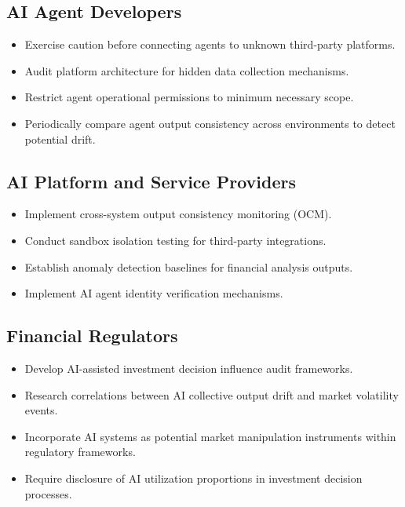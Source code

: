 \documentclass[11pt,a4paper]{article}
\begin{document}
\subsection{AI Agent Developers}
\begin{itemize}[leftmargin=2em]
  \item Exercise caution before connecting agents to unknown third-party platforms.
  \item Audit platform architecture for hidden data collection mechanisms.
  \item Restrict agent operational permissions to minimum necessary scope.
  \item Periodically compare agent output consistency across environments
        to detect potential drift.
\end{itemize}

\subsection{AI Platform and Service Providers}
\begin{itemize}[leftmargin=2em]
  \item Implement cross-system output consistency monitoring (OCM).
  \item Conduct sandbox isolation testing for third-party integrations.
  \item Establish anomaly detection baselines for financial analysis outputs.
  \item Implement AI agent identity verification mechanisms.
\end{itemize}

\subsection{Financial Regulators}
\begin{itemize}[leftmargin=2em]
  \item Develop AI-assisted investment decision influence audit frameworks.
  \item Research correlations between AI collective output drift and
        market volatility events.
  \item Incorporate AI systems as potential market manipulation instruments
        within regulatory frameworks.
  \item Require disclosure of AI utilization proportions in investment
        decision processes.
\end{itemize}
\end{document}
